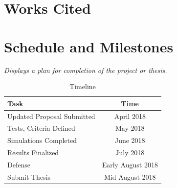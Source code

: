 \documentclass {article}
\newcommand{\sechint}[1]{\small{\emph{#1}} \bigskip}
\begin{document}
\pagebreak
\section{Works Cited}
\printbibliography[title={\ }]

\pagebreak
\section{Schedule and Milestones}{\sechint{Displays a plan for completion of the project or thesis.}}

\begin{table}[!ht]
	\centering
	\begin{tabular}{l|c}
		\hline
		Task & Time \\ \hline \hline
		Updated Proposal Submitted & April 2018 \\ \hline
		Tests, Criteria Defined & May 2018 \\ \hline
		Simulations Completed & June 2018 \\ \hline
		Results Finalized & July 2018 \\ \hline
		Defense & Early August 2018 \\ \hline
		Submit Thesis & Mid August 2018 \\ \hline
	\end{tabular}
	\caption{Timeline}
\end{table}
\end{document}
